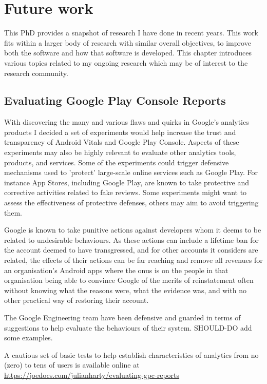 \chapter{Future work}
This PhD provides a snapshot of research I have done in recent years. This work fits within a larger body of research with similar overall objectives, to improve both the software and how that software is developed. This chapter introduces various topics related to my ongoing research which may be of interest to the research community.

\section{Evaluating Google Play Console Reports}
With discovering the many and various flaws and quirks in Google's analytics products I decided a set of experiments would help increase the trust and transparency of Android Vitals and Google Play Console. Aspects of these experiments may also be highly relevant to evaluate other analytics tools, products, and services. Some of the experiments could trigger defensive mechanisms used to 'protect' large-scale online services such as Google Play. For instance App Stores, including Google Play, are known to take protective and corrective activities related to fake reviews. Some experiments might want to assess the effectiveness of protective defenses, others may aim to avoid triggering them. 

Google is known to take punitive actions against developers whom it deems to be related to undesirable behaviours. %
As these actions can include a lifetime ban for the account deemed to have transgressed, and for other accounts it considers are related, the effects of their actions can be far reaching and remove all revenues for an organisation's Android apps where the onus is on the people in that organisation being able to convince Google of the merits of reinstatement often without knowing what the reasons were, what the evidence was, and with no other practical way of restoring their account.

The Google Engineering team have been defensive and guarded in terms of suggestions to help evaluate the behaviours of their system. SHOULD-DO add some examples. 

A cautious set of basic tests to help establish characteristics of analytics from no (zero) to tens of users is available online at 
\url{https://joedocs.com/julianharty/evaluating-gpc-reports}

